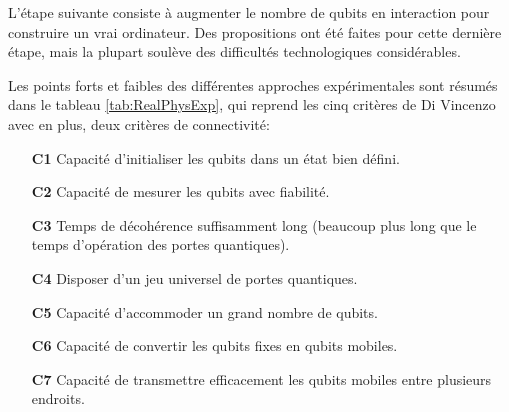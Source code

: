 L'étape suivante consiste à augmenter le nombre de qubits en interaction pour
construire un vrai ordinateur. Des propositions ont été faites pour cette
dernière étape, mais la plupart soulève des difficultés technologiques
considérables.

Les points forts et faibles des différentes approches expérimentales sont
résumés dans le tableau \ref{tab:RealPhysExp}, qui reprend les cinq critères de
Di Vincenzo avec en plus, deux critères de connectivité:

\begin{itemize}
\item[\textbf{C1}]Capacité d'initialiser les qubits dans un état bien défini.

\item[\textbf{C2}]Capacité de mesurer les qubits avec fiabilité.

\item[\textbf{C3}]Temps de décohérence suffisamment long (beaucoup plus long que
le temps d'opération des portes quantiques).

\item[\textbf{C4}]Disposer d'un jeu universel de portes quantiques.

\item[\textbf{C5}]Capacité d'accommoder un grand nombre de qubits.

\item[\textbf{C6}]Capacité de convertir les qubits fixes en qubits mobiles.

\item[\textbf{C7}]Capacité de transmettre efficacement les qubits mobiles entre
plusieurs endroits.
\end{itemize}

